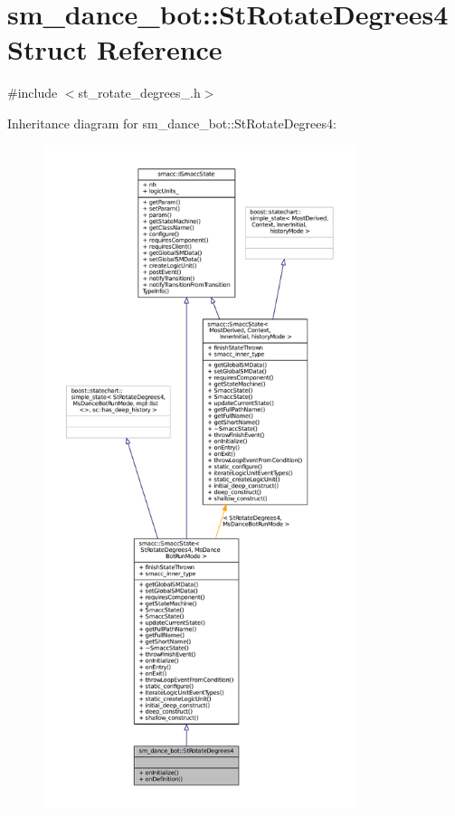 \hypertarget{structsm__dance__bot_1_1StRotateDegrees4}{}\section{sm\+\_\+dance\+\_\+bot\+:\+:St\+Rotate\+Degrees4 Struct Reference}
\label{structsm__dance__bot_1_1StRotateDegrees4}


{\ttfamily \#include $<$st\+\_\+rotate\+\_\+degrees\+\_.\+h$>$}



Inheritance diagram for sm\+\_\+dance\+\_\+bot\+:\+:St\+Rotate\+Degrees4\+:
\nopagebreak
\begin{figure}[H]
\begin{center}
\leavevmode
\includegraphics[height=550pt]{structsm__dance__bot_1_1StRotateDegrees4__inherit__graph}
\end{center}
\end{figure}


